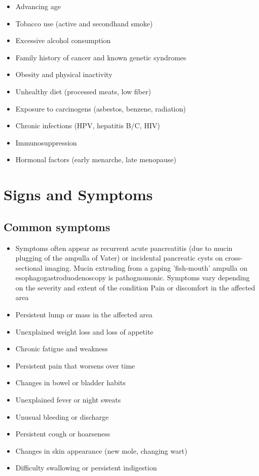\begin{itemize}[noitemsep]
  \item Advancing age
  \item Tobacco use (active and secondhand smoke)
  \item Excessive alcohol consumption
  \item Family history of cancer and known genetic syndromes
  \item Obesity and physical inactivity
  \item Unhealthy diet (processed meats, low fiber)
  \item Exposure to carcinogens (asbestos, benzene, radiation)
  \item Chronic infections (HPV, hepatitis B/C, HIV)
  \item Immunosuppression
  \item Hormonal factors (early menarche, late menopause)
\end{itemize}
\section{Signs and Symptoms}

\subsection{Common symptoms}
\begin{itemize}[noitemsep]
  \item Symptoms often appear as recurrent acute pancreatitis (due to mucin plugging of the ampulla of Vater) or incidental pancreatic cysts on cross-sectional imaging. Mucin extruding from a gaping 'fish-mouth' ampulla on esophagogastroduodenoscopy is pathognomonic. Symptoms vary depending on the severity and extent of the condition Pain or discomfort in the affected area     \item Persistent lump or mass in the affected area
  \item Unexplained weight loss and loss of appetite
  \item Chronic fatigue and weakness
  \item Persistent pain that worsens over time
  \item Changes in bowel or bladder habits
  \item Unexplained fever or night sweats
  \item Unusual bleeding or discharge
  \item Persistent cough or hoarseness
  \item Changes in skin appearance (new mole, changing wart)
  \item Difficulty swallowing or persistent indigestion
\end{itemize}

